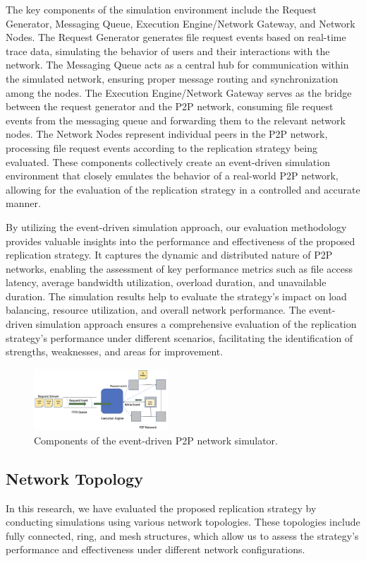 \documentclass[10pt, conference]{IEEEtran}
\begin{document}
The key components of the simulation environment include the Request Generator, Messaging Queue, Execution Engine/Network Gateway, and Network Nodes. The Request Generator generates file request events based on real-time trace data, simulating the behavior of users and their interactions with the network. The Messaging Queue acts as a central hub for communication within the simulated network, ensuring proper message routing and synchronization among the nodes. The Execution Engine/Network Gateway serves as the bridge between the request generator and the P2P network, consuming file request events from the messaging queue and forwarding them to the relevant network nodes. The Network Nodes represent individual peers in the P2P network, processing file request events according to the replication strategy being evaluated. These components collectively create an event-driven simulation environment that closely emulates the behavior of a real-world P2P network, allowing for the evaluation of the replication strategy in a controlled and accurate manner.

By utilizing the event-driven simulation approach, our evaluation methodology provides valuable insights into the performance and effectiveness of the proposed replication strategy. It captures the dynamic and distributed nature of P2P networks, enabling the assessment of key performance metrics such as file access latency, average bandwidth utilization, overload duration, and unavailable duration. The simulation results help to evaluate the strategy's impact on load balancing, resource utilization, and overall network performance. The event-driven simulation approach ensures a comprehensive evaluation of the replication strategy's performance under different scenarios, facilitating the identification of strengths, weaknesses, and areas for improvement.

\begin{figure}[htbp]
    \centering
    \includegraphics[width=0.45\textwidth]
    {project/fig/architecture.png}
    \caption{Components of the event-driven P2P network simulator.}
    \label{fig:architecture}
\end{figure}

\subsection{Network Topology}
In this research, we have evaluated the proposed replication strategy by conducting simulations using various network topologies. These topologies include fully connected, ring, and mesh structures, which allow us to assess the strategy's performance and effectiveness under different network configurations.
\end{document}
